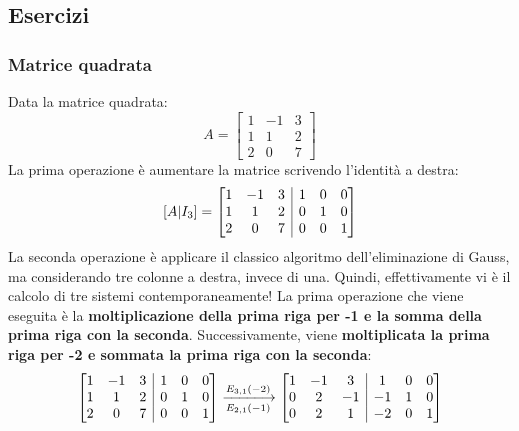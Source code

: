 \documentclass[a4paper]{article}
\makeatletter
\newenvironment{rowequmatbra}[1]{\left[\array{@{}#1@{}}}{\endarray\right]}
\makeatother
\begin{document}
	\subsection{Esercizi}
	
	\subsubsection{Matrice quadrata}
	
	Data la matrice quadrata:
	\begin{equation*}
		A = \begin{bmatrix}
			1 & -1 & 3 \\
			1 &  1 & 2 \\
			2 &  0 & 7
		\end{bmatrix}
	\end{equation*}
	La \textcolor{Red3}{prima operazione} è aumentare la matrice scrivendo l'identità a destra:
	\begin{equation*}
		\left[A | I_{3}\right] = \begin{rowequmatbra}{ccc|ccc}
			1 & -1 & 3 & 1 & 0 & 0 \\
			1 &  1 & 2 & 0 & 1 & 0 \\
			2 &  0 & 7 & 0 & 0 & 1
		\end{rowequmatbra}
	\end{equation*}
	La \textcolor{Red3}{seconda operazione} è applicare il classico algoritmo dell'eliminazione di Gauss, ma considerando tre colonne a destra, invece di una. Quindi, effettivamente vi è il calcolo di tre sistemi contemporaneamente! La prima operazione che viene eseguita è la \textbf{moltiplicazione della prima riga per -1 e la somma della prima riga con la seconda}. Successivamente, viene \textbf{moltiplicata la prima riga per -2 e sommata la prima riga con la seconda}:
	\begin{equation*}
		\begin{rowequmatbra}{ccc|ccc}
			1 & -1 & 3 & 1 & 0 & 0 \\
			1 &  1 & 2 & 0 & 1 & 0 \\
			2 &  0 & 7 & 0 & 0 & 1
		\end{rowequmatbra} \xlongrightarrow[E_{2,1}\left(-1\right)]{E_{3,1}\left(-2\right)}
		\begin{rowequmatbra}{ccc|ccc}
			1 & -1 &  3 &  1 & 0 & 0 \\
			0 &  2 & -1 & -1 & 1 & 0 \\
			0 &  2 &  1 & -2 & 0 & 1
		\end{rowequmatbra}
	\end{equation*}
\end{document}
